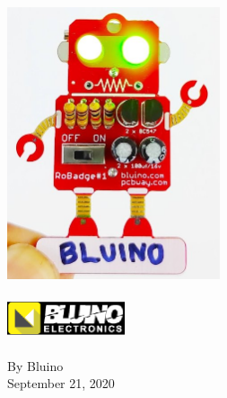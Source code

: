 \documentclass[a4paper]{article}
\begin{document}
\maketitle
\begin{center}
\includegraphics[height=8cm]{../pictures/Ready.jpg}\ \\
\ \\
\includegraphics[height=1cm]{../pictures/header-bluino.png}
\ \\
\ \\
By Bluino \\
September 21, 2020 \\
\end{center}
\newpage
\end{document}
